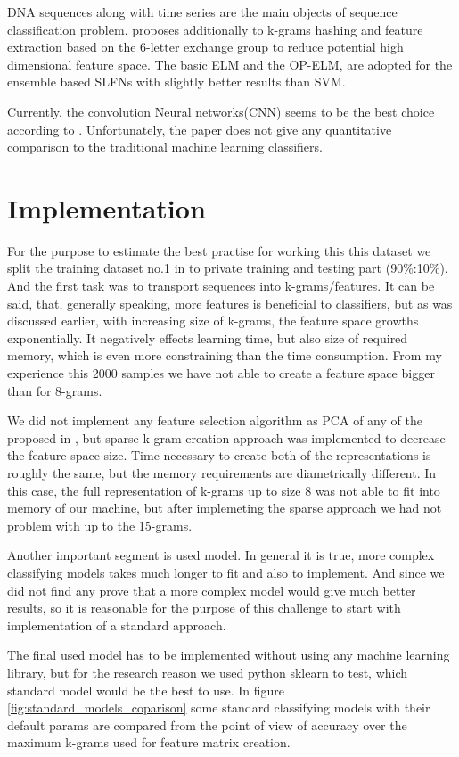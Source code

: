 \documentclass{article}
\begin{document}
DNA sequences along with time series are the main objects of sequence classification problem. \cite{cao2014protein} proposes additionally to k-grams hashing and feature extraction based on the 6-letter exchange group to reduce potential high dimensional feature space. The basic ELM and the OP-ELM, are adopted for the ensemble based SLFNs with slightly better results than SVM.


Currently, the convolution Neural networks(CNN) seems to be the best choice according to \cite{zeng2016convolutional}. Unfortunately, the paper does not give any quantitative comparison to the traditional machine learning classifiers. 


\section{Implementation}

For the purpose to estimate the best practise for working this this dataset we split the training dataset no.1 in to private training and testing part (90\%:10\%). And the first task was to transport sequences into k-grams/features. It can be said, that, generally speaking, more features is beneficial to classifiers, but as was discussed earlier, with increasing size of k-grams, the feature space growths exponentially. It negatively effects learning time, but also size of required memory, which is even more constraining than the time consumption. From my experience this 2000 samples we have not able to create a feature space bigger than for 8-grams. 

We did not implement any feature selection algorithm as PCA of any of the proposed in \cite{xing2010brief}, but sparse k-gram creation approach was implemented to decrease the feature space size. Time necessary to create both of the representations is roughly the same, but the memory requirements are diametrically different. In this case, the full representation of k-grams up to size 8 was not able to fit into memory of our machine, but after implemeting the sparse approach we had not problem with up to the 15-grams.

Another important segment is used model. In general it is true, more complex classifying models takes much longer to fit and also to implement. And since we did not find any prove that a more complex model would give much better results, so it is reasonable for the purpose of this challenge to start with implementation of a standard approach.

The final used model has to be implemented without using any machine learning library, but for the research reason we used python sklearn to test, which standard model would be the best to use. In figure \ref{fig:standard_models_coparison} some standard classifying models with their default params are compared from the point of view of accuracy over the maximum k-grams used for feature matrix creation.
\end{document}
